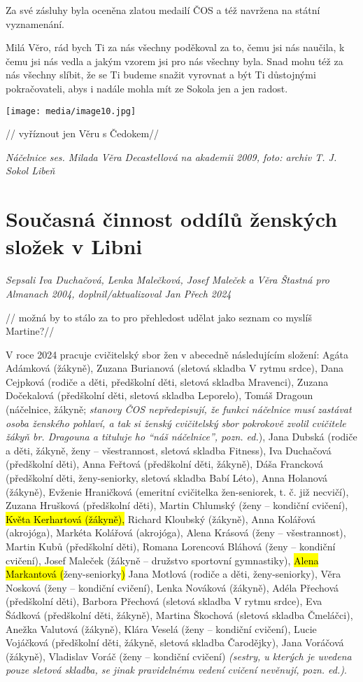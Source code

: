 Za své zásluhy byla oceněna zlatou medailí ČOS a též navržena na státní
vyznamenání.

Milá Věro, rád bych Ti za nás všechny poděkoval za to, čemu jsi nás
naučila, k čemu jsi nás vedla a jakým vzorem jsi pro nás všechny byla.
Snad mohu též za nás všechny slíbit, že se Ti budeme snažit vyrovnat a
být Ti důstojnými pokračovateli, abys i nadále mohla mít ze Sokola jen a
jen radost.

\texttt{[image: media/image10.jpg]}

// vyříznout jen Věru s Čedokem//

\emph{Náčelnice ses. Milada Věra Decastellová na akademii 2009, foto:
archiv T. J. Sokol Libeň}

\section{Současná činnost oddílů ženských složek v
Libni}\label{souux10dasnuxe1-ux10dinnost-odduxedlux16f-ux17eenskuxfdch-sloux17eek-v-libni}

\emph{Sepsali Iva Duchačová, Lenka Malečková, Josef Maleček a Věra
Štastná pro Almanach 2004, doplnil/aktualizoval Jan Přech 2024}

// možná by to stálo za to pro přehledost udělat jako seznam co myslíš
Martine?//

V roce 2024 pracuje cvičitelský sbor žen v abecedně následujícím
složení: Agáta Adámková (žákyně), Zuzana Burianová (sletová skladba V
rytmu srdce), Dana Cejpková (rodiče a děti, předškolní děti, sletová
skladba Mravenci), Zuzana Dočekalová (předškolní děti, sletová skladba
Leporelo), Tomáš Dragoun (náčelnice, žákyně; \emph{stanovy ČOS
nepředepisují, že funkci náčelnice musí zastávat osoba ženského pohlaví,
a tak si ženský cvičitelský sbor pokrokově zvolil cvičitele žákyň br.
Dragouna a tituluje ho ``náš náčelnice'', pozn. ed.}), Jana Dubská
(rodiče a děti, žákyně, ženy -- všestrannost, sletová skladba Fitness),
Iva Duchačová (předškolní děti), Anna Feřtová (předškolní děti, žákyně),
Dáša Francková (předškolní děti, ženy-seniorky, sletová skladba Babí
Léto), Anna Holanová (žákyně), Evženie Hraničková (emeritní cvičitelka
žen-seniorek, t. č. již necvičí), Zuzana Hrušková (předškolní děti),
Martin Chlumský (ženy -- kondiční cvičení), \hl{Květa Kerhartová
(žákyně),} Richard Kloubský (žákyně), Anna Kolářová (akrojóga), Markéta
Kolářová (akrojóga), Alena Krásová (ženy -- všestrannost), Martin Kubů
(předškolní děti), Romana Lorencová Bláhová (ženy -- kondiční cvičení),
Josef Maleček (žákyně -- družstvo sportovní gymnastiky), \hl{Alena
Markantová (}ženy-seniorky\hl{)} Jana Motlová (rodiče a děti,
ženy-seniorky), Věra Nosková (ženy -- kondiční cvičení), Lenka Nováková
(žákyně), Adéla Přechová (předškolní děti), Barbora Přechová (sletová
skladba V rytmu srdce), Eva Šádková (předškolní děti, žákyně), Martina
Škochová (sletová skladba Čmeláčci), Anežka Valutová (žákyně), Klára
Veselá (ženy -- kondiční cvičení), Lucie Vojáčková (předškolní děti,
žákyně, sletová skladba Čarodějky), Jana Voráčová (žákyně), Vladislav
Voráč (ženy -- kondiční cvičení) \emph{(sestry, u kterých je uvedena
pouze sletová skladba, se jinak pravidelnému vedení cvičení nevěnují,
pozn. ed.)}.

